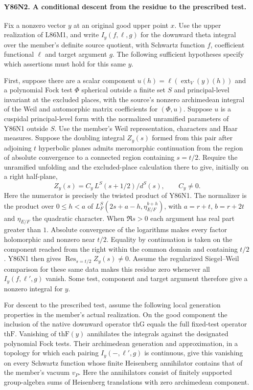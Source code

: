 \paragraph{Y86N2. A conditional descent from the residue to the prescribed test.}
Fix a nonzero vector $y$ at an original good upper point $x$.
Use the upper realization of L86M1, and write $I_y(f,\ell,g)$ for
the downward theta integral over the member's definite source
quotient, with Schwartz function $f$, coefficient functional $\ell$
and target argument $g$. The following sufficient hypotheses
specify which assertions must hold for this same $y$.

First, suppose there are a scalar component
$u(h)=\ell(\operatorname{ext}_V(y)(h))$ and a polynomial Fock test
$\Phi$ spherical outside a finite set $S$ and principal-level
invariant at the excluded places, with the source's nonzero
archimedean integral of the Weil and automorphic matrix coefficients
for $(\Phi,u)$. Suppose $u$ is a cuspidal principal-level form with
the normalized unramified parameters of Y86N1 outside $S$.
Use the member's Weil representation, characters and Haar measures.
Suppose the doubling integral $Z_y(s)$ formed from this pair after
adjoining $t$ hyperbolic planes admits meromorphic continuation from
the region of absolute convergence to a connected region containing
$s=t/2$. Require the unramified unfolding and the excluded-place
calculation there to give, initially on a right half-plane,
\[
 Z_y(s)=C_y\,L^S(s+1/2)/d^S(s),\qquad C_y\ne0.
\]
Here the numerator is precisely the twisted product of Y86N1.
The normalizer is the product over $0\le h<a$ of
$L_F^S(2s+a-h,\eta_{E/F}^{b+h})$, with $a=r+t$, $b=r+2t$ and
$\eta_{E/F}$ the quadratic character. When $\Re s>0$ each argument
has real part greater than $1$. Absolute convergence of the logarithms
makes every factor holomorphic and nonzero near $t/2$.
Equality by continuation is taken on the component reached from the
right within the common domain and containing $t/2$.
Y86N1 then gives $\operatorname{Res}_{s=t/2} Z_y(s)\ne0$.
Assume the regularized Siegel--Weil comparison for these same data
makes this residue zero whenever all $I_y(f,\ell',g)$ vanish.
Some test, component and target argument therefore give a nonzero
integral for $y$.

For descent to the prescribed test, assume the following local
generation properties in the member's actual realization.
On the good component the inclusion of the native downward
operator $\mathrm{thG}$ equals the full fixed-test operator
$\mathrm{thF}$. Vanishing of $\mathrm{thF}(y)$ annihilates the
integrals against the designated polynomial Fock tests. Their
archimedean generation and approximation, in a topology for which
each pairing $I_y(-,\ell',g)$ is continuous, give this vanishing
on every Schwartz function whose finite Heisenberg annihilator
contains that of the member's vacuum $v_P$. Here the annihilators
consist of finitely supported group-algebra sums of Heisenberg
translations with zero archimedean component.

